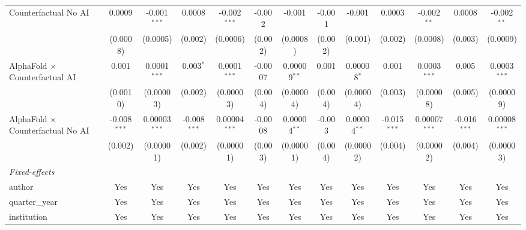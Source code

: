 \begin{tabular}{lcccccccccccc}
   Counterfactual No AI                     & 0.0009         & -0.001$^{***}$  & 0.0008         & -0.002$^{***}$  & -0.002         & -0.001         & -0.001        & -0.001         & 0.0003         & -0.002$^{**}$   & 0.0008         & -0.002$^{**}$\\   
                                            & (0.0008)       & (0.0005)        & (0.002)        & (0.0006)        & (0.002)        & (0.0008)       & (0.002)       & (0.001)        & (0.002)        & (0.0008)        & (0.003)        & (0.0009)\\   
   AlphaFold $\times$ Counterfactual AI     & 0.001          & 0.0001$^{***}$  & 0.003$^{*}$    & 0.0001$^{***}$  & -0.0007        & 0.00009$^{**}$ & 0.001         & 0.00008$^{*}$  & 0.001          & 0.0003$^{***}$  & 0.005          & 0.0003$^{***}$\\   
                                            & (0.0010)       & (0.00003)       & (0.002)        & (0.00003)       & (0.004)        & (0.00004)      & (0.004)       & (0.00004)      & (0.003)        & (0.00008)       & (0.005)        & (0.00009)\\   
   AlphaFold $\times$ Counterfactual No AI  & -0.008$^{***}$ & 0.00003$^{***}$ & -0.008$^{***}$ & 0.00004$^{***}$ & -0.0008        & 0.00004$^{**}$ & -0.003        & 0.00004$^{**}$ & -0.015$^{***}$ & 0.00007$^{***}$ & -0.016$^{***}$ & 0.00008$^{***}$\\   
                                            & (0.002)        & (0.00001)       & (0.002)        & (0.00001)       & (0.003)        & (0.00001)      & (0.004)       & (0.00002)      & (0.004)        & (0.00002)       & (0.004)        & (0.00003)\\   
   \midrule
   \emph{Fixed-effects}\\
   author                                   & Yes            & Yes             & Yes            & Yes             & Yes            & Yes            & Yes           & Yes            & Yes            & Yes             & Yes            & Yes\\  
   quarter\_year                            & Yes            & Yes             & Yes            & Yes             & Yes            & Yes            & Yes           & Yes            & Yes            & Yes             & Yes            & Yes\\  
   institution                              & Yes            & Yes             & Yes            & Yes             & Yes            & Yes            & Yes           & Yes            & Yes            & Yes             & Yes            & Yes\\  

\end{tabular}
